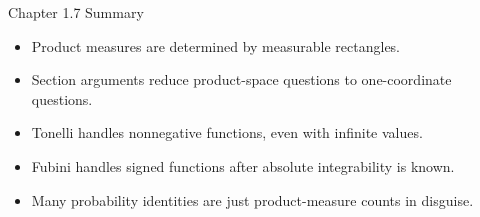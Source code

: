 \begin{frame}{Chapter 1.7 Summary}
  \begin{itemize}
    \item Product measures are determined by measurable rectangles.
    \item Section arguments reduce product-space questions to one-coordinate questions.
    \item Tonelli handles nonnegative functions, even with infinite values.
    \item Fubini handles signed functions after absolute integrability is known.
    \item Many probability identities are just product-measure counts in disguise.
  \end{itemize}
\end{frame}


